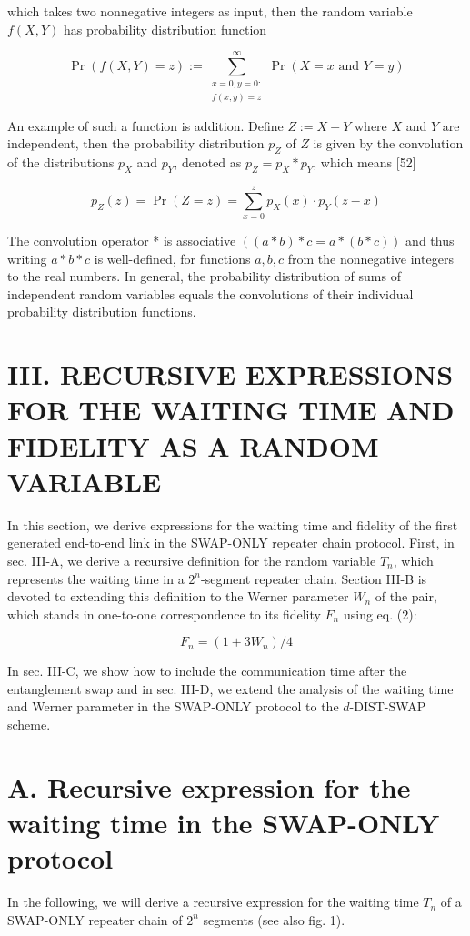 \documentclass[10pt]{article}
\begin{document}
which takes two nonnegative integers as input, then the random variable $f(X, Y)$ has probability distribution function

$$
\operatorname{Pr}(f(X, Y)=z):=\sum_{\substack{x=0, y=0: \\ f(x, y)=z}}^{\infty} \operatorname{Pr}(X=x \text { and } Y=y)
$$

An example of such a function is addition. Define $Z:=X+Y$ where $X$ and $Y$ are independent, then the probability distribution $p_{Z}$ of $Z$ is given by the convolution of the distributions $p_{X}$ and $p_{Y}$, denoted as $p_{Z}=p_{X} * p_{Y}$, which means [52]

$$
p_{Z}(z)=\operatorname{Pr}(Z=z)=\sum_{x=0}^{z} p_{X}(x) \cdot p_{Y}(z-x)
$$

The convolution operator * is associative $((a * b) * c=a *(b * c))$ and thus writing $a * b * c$ is well-defined, for functions $a, b, c$ from the nonnegative integers to the real numbers. In general, the probability distribution of sums of independent random variables equals the convolutions of their individual probability distribution functions.

\section*{III. RECURSIVE EXPRESSIONS FOR THE WAITING TIME AND FIDELITY AS A RANDOM VARIABLE}
In this section, we derive expressions for the waiting time and fidelity of the first generated end-to-end link in the SWAP-ONLY repeater chain protocol. First, in sec. III-A, we derive a recursive definition for the random variable $T_{n}$, which represents the waiting time in a $2^{n}$-segment repeater chain. Section III-B is devoted to extending this definition to the Werner parameter $W_{n}$ of the pair, which stands in one-to-one correspondence to its fidelity $F_{n}$ using eq. (2):


\begin{equation*}
F_{n}=\left(1+3 W_{n}\right) / 4 \tag{7}
\end{equation*}


In sec. III-C, we show how to include the communication time after the entanglement swap and in sec. III-D, we extend the analysis of the waiting time and Werner parameter in the SWAP-ONLY protocol to the $d$-DIST-SWAP scheme.

\section*{A. Recursive expression for the waiting time in the SWAP-ONLY protocol}
In the following, we will derive a recursive expression for the waiting time $T_{n}$ of a SWAP-ONLY repeater chain of $2^{n}$ segments (see also fig. 1).
\end{document}

